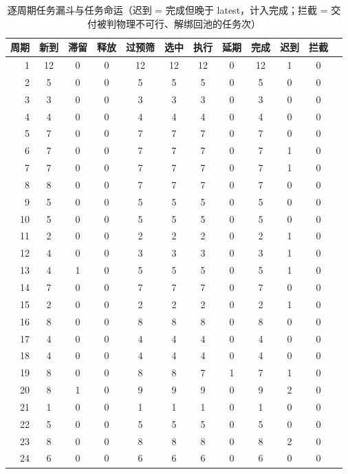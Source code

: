 \documentclass[a4paper,11pt]{article}
\begin{document}
\begin{table}[htbp]\centering
\caption{逐周期任务漏斗与任务命运（迟到 = 完成但晚于 latest，计入完成；拦截 = 交付被判物理不可行、解绑回池的任务次）}
\label{tab:exp01-funnel}
\begin{tabular}{rccccccccccc}
\toprule
周期 & 新到 & 滞留 & 释放 & 过预筛 & 选中 & 执行 & 延期 & 完成 & 迟到 & 拦截 \\
\midrule
1 & 12 & 0 & 0 & 12 & 12 & 12 & 0 & 12 & 1 & 0 \\
2 & 5 & 0 & 0 & 5 & 5 & 5 & 0 & 5 & 0 & 0 \\
3 & 3 & 0 & 0 & 3 & 3 & 3 & 0 & 3 & 0 & 0 \\
4 & 4 & 0 & 0 & 4 & 4 & 4 & 0 & 4 & 0 & 0 \\
5 & 7 & 0 & 0 & 7 & 7 & 7 & 0 & 7 & 0 & 0 \\
6 & 7 & 0 & 0 & 7 & 7 & 7 & 0 & 7 & 1 & 0 \\
7 & 7 & 0 & 0 & 7 & 7 & 7 & 0 & 7 & 1 & 0 \\
8 & 8 & 0 & 0 & 7 & 7 & 7 & 0 & 7 & 0 & 0 \\
9 & 5 & 0 & 0 & 5 & 5 & 5 & 0 & 5 & 0 & 0 \\
10 & 5 & 0 & 0 & 5 & 5 & 5 & 0 & 5 & 0 & 0 \\
11 & 2 & 0 & 0 & 2 & 2 & 2 & 0 & 2 & 1 & 0 \\
12 & 4 & 0 & 0 & 3 & 3 & 3 & 0 & 3 & 1 & 0 \\
13 & 4 & 1 & 0 & 5 & 5 & 5 & 0 & 5 & 1 & 0 \\
14 & 7 & 0 & 0 & 7 & 7 & 7 & 0 & 7 & 0 & 0 \\
15 & 2 & 0 & 0 & 2 & 2 & 2 & 0 & 2 & 1 & 0 \\
16 & 8 & 0 & 0 & 8 & 8 & 8 & 0 & 8 & 0 & 0 \\
17 & 4 & 0 & 0 & 4 & 4 & 4 & 0 & 4 & 0 & 0 \\
18 & 4 & 0 & 0 & 4 & 4 & 4 & 0 & 4 & 0 & 0 \\
19 & 8 & 0 & 0 & 8 & 8 & 7 & 1 & 7 & 1 & 0 \\
20 & 8 & 1 & 0 & 9 & 9 & 9 & 0 & 9 & 2 & 0 \\
21 & 1 & 0 & 0 & 1 & 1 & 1 & 0 & 1 & 0 & 0 \\
22 & 5 & 0 & 0 & 5 & 5 & 5 & 0 & 5 & 0 & 0 \\
23 & 8 & 0 & 0 & 8 & 8 & 8 & 0 & 8 & 2 & 0 \\
24 & 6 & 0 & 0 & 6 & 6 & 6 & 0 & 6 & 0 & 0 \\
\bottomrule
\end{tabular}
\end{table}
\end{document}
